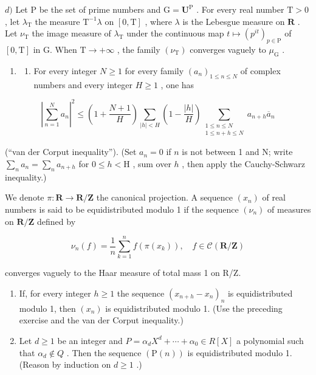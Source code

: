 \(d)\) Let P be the set of prime numbers and \(\mathrm{G} = \mathbf{U}^{\mathrm{P}}\) . For every real number \(\mathrm{T} > 0\) , let \(\lambda_{\mathrm{T}}\) the measure \(\mathrm{T}^{-1}\lambda\) on \([0,\mathrm{T}]\) , where \(\lambda\) is the Lebesgue measure on \(\mathbf{R}\) . Let \(\nu_{\mathrm{T}}\) the image measure of \(\lambda_{\mathrm{T}}\) under the continuous map \(t\mapsto (p^{it})_{p\in \mathrm{P}}\) of \([0,\mathrm{T}]\) in G. When \(\mathrm{T}\to +\infty\) , the family \((\nu_{\mathrm{T}})\) converges vaguely to \(\mu_{\mathrm{G}}\) .

\begin{enumerate}
\def\labelenumi{\arabic{enumi})}
\setcounter{enumi}{34}
\tightlist
\item
  \begin{enumerate}
  \def\labelenumii{\alph{enumii})}
  \tightlist
  \item
    For every integer \(N \geqslant 1\) for every family \((a_{n})_{1 \leqslant n \leqslant N}\) of complex numbers and every integer \(H \geqslant 1\) , one has
  \end{enumerate}
\end{enumerate}

\[
\left|\sum_{n = 1}^{N}a_{n}\right|^{2}\leqslant \left(1 + \frac{N + 1}{H}\right)\sum_{|h| <   H}\left(1 - \frac{|h|}{H}\right)\sum_{\substack{1\leqslant n\leqslant N\\ 1\leqslant n + h\leqslant N}}a_{n + h}\overline{a}_{n}
\]

(“van der Corput inequality”). (Set \(a_{n}=0\) if \(n\) is not between 1 and N; write \(\sum_{n}a_{n}=\sum_{n}a_{n+h}\) for \(0\leqslant h<\mathrm{H}\) , sum over \(h\) , then apply the Cauchy-Schwarz inequality.)

We denote \(\pi\colon\mathbf{R}\to\mathbf{R}/\mathbf{Z}\) the canonical projection. A sequence \((x_{n})\) of real numbers is said to be equidistributed modulo 1 if the sequence \((\nu_{n})\) of measures on \(\mathbf{R}/\mathbf{Z}\) defined by

\[
\nu_ {n} (f) = \frac {1}{n} \sum_ {k = 1} ^ {n} f (\pi (x _ {k})), \quad f \in \mathscr {C} (\mathbf {R} / \mathbf {Z})
\]

converges vaguely to the Haar measure of total mass 1 on R/Z.

\begin{enumerate}
\def\labelenumi{\alph{enumi})}
\setcounter{enumi}{1}
\item
  If, for every integer \(h \geqslant 1\) the sequence \((x_{n+h} - x_n)_n\) is equidistributed modulo 1, then \((x_n)\) is equidistributed modulo 1. (Use the preceding exercise and the van der Corput inequality.)
\item
  Let \(d \geqslant 1\) be an integer and \(P = \alpha_{d} X^{d} + \cdots + \alpha_{0} \in R[X]\) a polynomial such that \(\alpha_{d} \notin Q\) . Then the sequence \((\mathrm{P}(n))\) is equidistributed modulo 1. (Reason by induction on \(d \geqslant 1\) .)
\end{enumerate}

